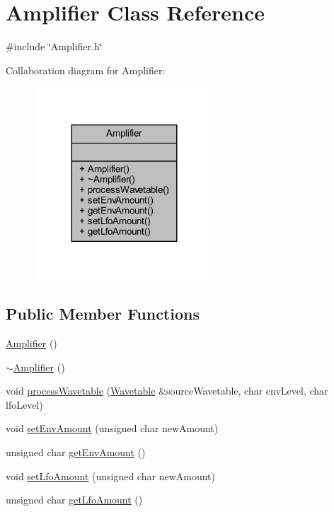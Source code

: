 \hypertarget{class_amplifier}{}\section{Amplifier Class Reference}
\label{class_amplifier}


{\ttfamily \#include \char`\"{}Amplifier.\+h\char`\"{}}



Collaboration diagram for Amplifier\+:
\nopagebreak
\begin{figure}[H]
\begin{center}
\leavevmode
\includegraphics[width=191pt]{df/d37/class_amplifier__coll__graph}
\end{center}
\end{figure}
\subsection*{Public Member Functions}
\begin{DoxyCompactItemize}
\item 
\hyperlink{class_amplifier_ad89ce9e2bd6877057d15266d0d3feb4e}{Amplifier} ()
\item 
\hyperlink{class_amplifier_a6cb2421d049843d6b1994364ea29aabd}{$\sim$\+Amplifier} ()
\item 
void \hyperlink{class_amplifier_a3f1ec0c50fdb0adb71e2f7576e38170a}{process\+Wavetable} (\hyperlink{class_wavetable}{Wavetable} \&source\+Wavetable, char env\+Level, char lfo\+Level)
\item 
void \hyperlink{class_amplifier_a1106605e158c9855d4e303e6972baf9f}{set\+Env\+Amount} (unsigned char new\+Amount)
\item 
unsigned char \hyperlink{class_amplifier_a4cb59ec35a428bf0361799326fbb42c3}{get\+Env\+Amount} ()
\item 
void \hyperlink{class_amplifier_a99593afade53ffadc6958861e38b612a}{set\+Lfo\+Amount} (unsigned char new\+Amount)
\item 
unsigned char \hyperlink{class_amplifier_aeb4c113b992aae7b6fa96fb7ebf9a5ca}{get\+Lfo\+Amount} ()
\end{DoxyCompactItemize}


